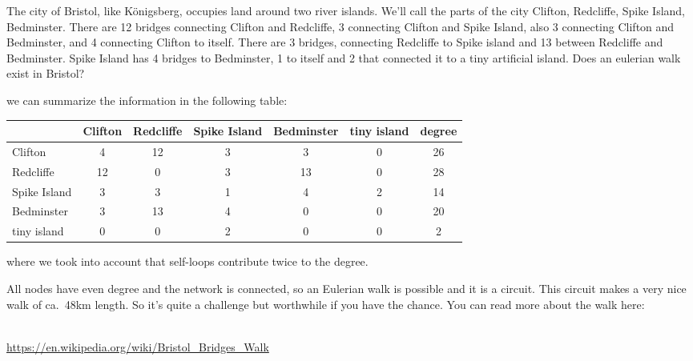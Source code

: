 
The city of Bristol, like K\"onigsberg, occupies land around two river islands. We'll call the parts of the city Clifton, Redcliffe, Spike Island, Bedminster. There are 12 bridges connecting Clifton and Redcliffe, 3 connecting Clifton and Spike Island, also 3 connecting Clifton and Bedminster, and 4 connecting Clifton to itself. There are 3 bridges, connecting Redcliffe to Spike island and 13 between Redcliffe and Bedminster. Spike Island has 4 bridges to Bedminster, 1 to itself and 2 that connected it to a tiny artificial island. Does an eulerian walk exist in Bristol?  
 
\solution
we can summarize the information in the following table: 
\begin{center}
\begin{tabular}{l | c c c c c | c}
 & Clifton & Redcliffe & Spike Island & Bedminster & tiny island & degree \\\hline
Clifton      & 4  & 12 & 3 & 3  & 0 & 26\\
Redcliffe    & 12 & 0  & 3 & 13 & 0 & 28\\
Spike Island & 3  & 3  & 1 & 4  & 2 & 14\\
Bedminster   & 3  & 13 & 4 & 0  & 0 & 20\\
tiny island  & 0  & 0  & 2 & 0  & 0 & 2 
\end{tabular}
\end{center}
where we took into account that self-loops contribute twice to the degree. 

All nodes have even degree and the network is connected, so an Eulerian walk is possible and it is a circuit. This circuit makes a very nice walk of ca.~48km length. So it's quite a challenge but worthwhile if you have the chance. You can read more about the walk here: 
\begin{center}
\\
\url{https://en.wikipedia.org/wiki/Bristol_Bridges_Walk}
\end{center}

